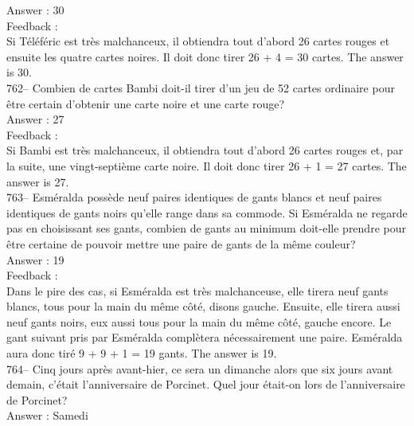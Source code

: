 \documentclass[letterpaper, 12pt]{article}
\begin{document}
Answer : 30\\

Feedback : \\
Si T\'el\'ef\'eric est tr\`es malchanceux, il obtiendra tout d'abord 26
cartes rouges et ensuite les quatre cartes noires.  Il doit donc tirer 26 +
4 = 30 cartes.  The answer is 30.\\

762-- Combien de cartes Bambi doit-il tirer d'un jeu de 52 cartes ordinaire
pour \^etre certain d'obtenir une carte noire et une carte rouge?\\

Answer : 27\\

Feedback : \\
Si Bambi est tr\`es malchanceux, il obtiendra tout d'abord 26 cartes rouges
et, par la suite, une vingt-septi\`eme carte noire.  Il doit donc tirer 26 +
1 = 27 cartes. The answer is 27.\\

763-- Esm\'eralda poss\`ede neuf paires identiques de gants blancs et neuf
paires identiques de gants noirs qu'elle range dans sa commode.  Si
Esm\'eralda ne regarde pas en choisissant ses gants, combien de gants au
minimum doit-elle prendre pour \^etre certaine de pouvoir mettre une paire
de gants de la m\^eme couleur?\\

Answer : 19\\

Feedback : \\
Dans le pire des cas, si Esm\'eralda est tr\`es malchanceuse, elle tirera
neuf gants blancs, tous pour la main du m\^eme c\^ot\'e, disons gauche.
Ensuite, elle tirera aussi neuf gants noirs, eux aussi tous pour la main du
m\^eme c\^ot\'e, gauche encore. Le gant suivant pris par Esm\'eralda
compl\`etera n\'ecessairement une paire. Esm\'eralda aura donc tir\'e 9 + 9
+ 1 = 19 gants.  The answer is 19.\\

764-- Cinq jours apr\`es avant-hier, ce sera un dimanche alors que six jours
avant demain, c'\'etait l'anniversaire de Porcinet.  Quel jour \'etait-on
lors de l'anniversaire de Porcinet?\\

Answer : Samedi\\
\end{document}

